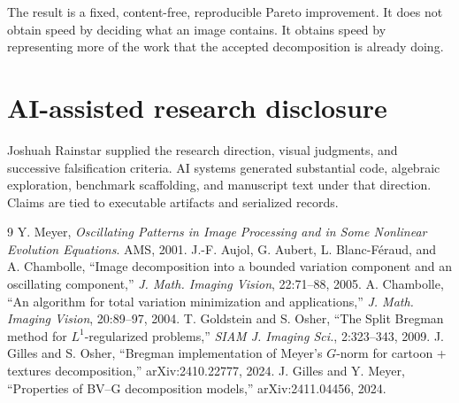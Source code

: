 \documentclass[10pt,twocolumn]{article}
\theoremstyle{definition}\newtheorem{remark}[proposition]{Remark}
\begin{document}
The result is a fixed, content-free, reproducible Pareto improvement.  It
does not obtain speed by deciding what an image contains.  It obtains speed
by representing more of the work that the accepted decomposition is already
doing.

\section*{AI-assisted research disclosure}

Joshuah Rainstar supplied the research direction, visual judgments, and
successive falsification criteria.  AI systems generated substantial code,
algebraic exploration, benchmark scaffolding, and manuscript text under that
direction.  Claims are tied to executable artifacts and serialized records.

\begin{thebibliography}{9}
 Y. Meyer, \emph{Oscillating Patterns in Image Processing
and in Some Nonlinear Evolution Equations}. AMS, 2001.
 J.-F. Aujol, G. Aubert, L. Blanc-F\'eraud, and A.
Chambolle, ``Image decomposition into a bounded variation component and an
oscillating component,'' \emph{J. Math. Imaging Vision}, 22:71--88, 2005.
 A. Chambolle, ``An algorithm for total variation
minimization and applications,'' \emph{J. Math. Imaging Vision}, 20:89--97,
2004.
 T. Goldstein and S. Osher, ``The Split Bregman method
for $L^1$-regularized problems,'' \emph{SIAM J. Imaging Sci.}, 2:323--343,
2009.
 J. Gilles and S. Osher, ``Bregman implementation of
Meyer's $G$-norm for cartoon + textures decomposition,'' arXiv:2410.22777,
2024.
 J. Gilles and Y. Meyer, ``Properties of BV--G
decomposition models,'' arXiv:2411.04456, 2024.
\end{thebibliography}
\end{document}
